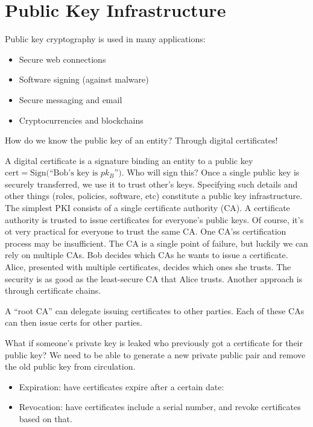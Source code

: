 \section{Public Key Infrastructure}

Public key cryptography is used in many applications:
\begin{itemize}
    \item Secure web connections
    \item Software signing (against malware)
    \item Secure messaging and email
    \item Cryptocurrencies and blockchains
\end{itemize}

How do we know the public key of an entity?
Through digital certificates!

A digital certificate is a signature binding an entity to a public key
$\text{cert} = \text{Sign(“Bob's key is $pk_B$”)}$.
Who will sign this?
Once a single public key is securely transferred,
we use it to trust other's keys.
Specifying such details and other things
(roles, policies, software, etc) constitute a
public key infrastructure.
The simplest PKI consists of a single certificate authority (CA).
A certificate authority is trusted to issue certificates
for everyone's public keys. Of course,
it's ot very practical for everyone to trust the same CA.
One CA'ss certification process may be insufficient.
The CA is a single point of failure, but luckily
we can rely on multiple CAs.
Bob decides which CAs he wants to issue a certificate.
Alice, presented with multiple certificates, decides
which ones she trusts.
The security is as good as the least-secure CA that Alice trusts.
Another approach is through certificate chains.

A “root CA” can delegate issuing certificates to other parties.
Each of these CAs can then issue certs for other parties.

What if someone's private key is leaked who previously got a certificate for their
public key?
We need to be able to generate a new private public pair and remove the old
public key from circulation.
\begin{itemize}
    \item Expiration: have certificates expire after a certain date:
    \item Revocation: have certificates include a serial number, and revoke certificates
          based on that.
\end{itemize}

